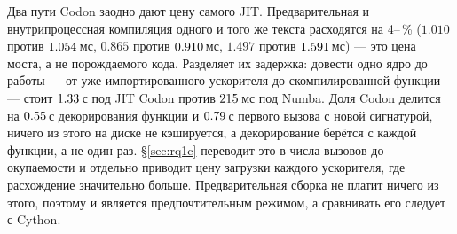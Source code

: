 Два пути Codon заодно дают цену самого JIT. Предварительная и внутрипроцессная компиляция
одного и того же текста расходятся на 4--\,\% ($1.010$ против $\meas{med:b1_compute-314:arraysum/codon_jit:ms}{1.054}$\,мс, $0.865$ против
$\meas{med:b1_compute-314:mandelbrot/codon_jit:ms}{0.910}$\,мс, $1.497$ против $\meas{med:b1_compute-314:matmul/codon_jit:ms}{1.591}$\,мс) --- это цена моста, а не порождаемого кода. Разделяет
их задержка: довести одно ядро до работы --- от уже импортированного ускорителя до
скомпилированной функции --- стоит $\meas{fact:b1_breakeven-314:facts.codon_cost_s.compile_s}{1.33}$\,с под JIT Codon против $\meas{fact:b1_breakeven-314:facts.numba_compile_s:ms}{215}$\,мс под Numba. Доля
Codon делится на $\meas{fact:b1_breakeven-314:facts.codon_cost_s.decorate_s}{0.55}$\,с декорирования функции и $\meas{fact:b1_breakeven-314:facts.codon_cost_s.first_call_s}{0.79}$\,с первого вызова с новой сигнатурой,
ничего из этого на диске не кэшируется, а декорирование берётся с каждой функции, а не один раз.
\S\ref{sec:rq1c} переводит это в числа вызовов до окупаемости и отдельно приводит цену загрузки
каждого ускорителя, где расхождение значительно больше. Предварительная сборка не платит ничего
из этого, поэтому  и является предпочтительным режимом, а сравнивать его следует
с Cython.

